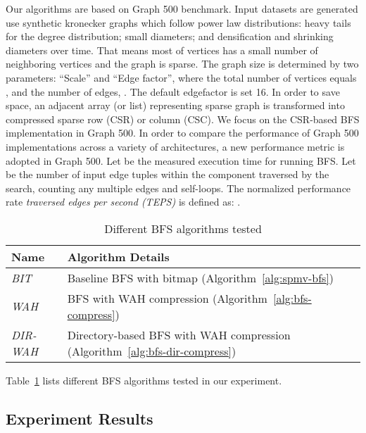 \documentclass[conference]{IEEEtran}
\begin{document}
Our algorithms are based on Graph 500 benchmark. Input datasets are generated
use synthetic kronecker graphs \cite{kronecker-graph} which follow power law
distributions: heavy tails for the degree distribution; small diameters; and
densification and shrinking diameters over time. That means most of vertices
has a small number of neighboring vertices and the graph is sparse.  The graph
size is determined by two parameters: ``Scale'' and ``Edge factor'', where the
total number of vertices  equals , and the number of edges, . The default edgefactor is set 16. In order to save space, an
adjacent array (or list) representing sparse graph is transformed into
compressed sparse row (CSR) or column (CSC). We focus on the CSR-based BFS
implementation in Graph 500. In order to compare the performance of Graph 500
implementations across a variety of architectures, a new performance metric is
adopted in Graph 500. Let  be the measured execution time for running
BFS. Let  be the number of input edge tuples within the component traversed
by the search, counting any multiple edges and self-loops. The normalized
performance rate \textit{traversed edges per second (TEPS)} is defined as:
.

\begin{table}[t]
  \caption{Different BFS algorithms tested}
  \label{table:diff-bfs-tested}
  \begin{center}
    \begin{tabularx}{0.48\textwidth}{ll}
      \toprule Name & Algorithm Details\\\midrule
      \textit{BIT} & Baseline BFS with bitmap (Algorithm~\ref{alg:spmv-bfs}) \\
      \textit{WAH} & BFS with WAH compression (Algorithm~\ref{alg:bfs-compress})\\
      \textit{DIR-WAH} & Directory-based BFS with WAH compression (Algorithm~\ref{alg:bfs-dir-compress})\\
\bottomrule
    \end{tabularx}
  \end{center}
\end{table}
Table~\ref{table:diff-bfs-tested} lists different BFS algorithms tested in our
experiment.

\subsection{Experiment Results}
\label{sec:exp-res}
\end{document}
